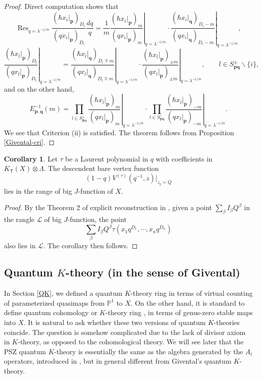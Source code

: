 \documentclass[10pt]{amsart}
\theoremstyle{definition}
\def\PP{{\mathbb{P}}}
\newcommand{\bp}{\mathbf{p}}
\newcommand{\bq}{\mathbf{q}}
\newcommand{\cL}{\mathcal{L}}
\newcommand{\Res}{\operatorname{Res}}
\newcommand{\bT}{\mathsf{T}}
\theoremstyle{definition}
\numberwithin{equation}{section}
\theoremstyle{Theorem}
\newtheorem{Corollary}[Definition]{Corollary}
\begin{document}
\begin{proof}
Direct computation shows that
$$
\Res_{q = \lambda^{-1/m}} \frac{ ( \hbar x_i |_\bp )_{D_i} }{ ( q x_i |_\bp )_{D_i} } \frac{dq}{q} = \frac{1}{m} \left. \frac{ ( \hbar x_i |_\bp )_{m} }{ ( q x_i |_\bp )_{m} } \right|_{q = \lambda^{-1/m}} \cdot \left. \frac{ ( \hbar x_i |_\bq )_{D_i - m} }{ ( q x_i |_\bq )_{D_i - m} } \right|_{q =  \lambda^{-1/m}} ,
$$
$$
\left. \frac{ ( \hbar x_l |_\bp )_{D_l} }{ ( q x_l |_\bp )_{D_l} } \right|_{q = \lambda^{-1/m}} = \left. \frac{ ( \hbar x_l |_\bq )_{D_l\mp m} }{ ( q x_l |_\bq )_{D_l \mp m} } \right|_{q = \lambda^{-1/m}} \cdot \left. \frac{ ( \hbar x_l |_\bp )_{\pm m} }{ ( q x_l |_\bp )_{\pm m} } \right|_{q = \lambda^{-1/m}}, \qquad l\in S_{\bp \bq}^\pm \backslash \{i\},
$$
and on the other hand,
$$
E_{\bp, \bq}^{-1} (m) =  \prod_{l\in S_{\bp \bq}^+} \left.  \frac{ ( \hbar x_l |_\bp )_{m} }{ ( q x_l |_\bp )_{m} } \right|_{q = \lambda^{-1/m}} \cdot \prod_{l\in S_{\bp \bq}^-} \left. \frac{ ( \hbar x_l |_\bp )_{-m} }{ ( q x_l |_\bp )_{-m} } \right|_{q = \lambda^{-1/m}}.
$$
We see that Criterion (ii) is satisfied. The theorem follows from Proposition \ref{Givental-cri}.
\end{proof}



\begin{Corollary} \label{V-tau}
Let $\tau$ be a Laurent polynomial in $q$ with coefficients in $K_\bT(X) \otimes \Lambda$. The descendent bare vertex function
$$
(1-q) V^{(\tau)} (q^{-1} , z) \big|_{z_\sharp = Q}
$$
lies in the range of big $J$-function of $X$.
\end{Corollary}

\begin{proof}
By the Theorem 2 of explicit reconstruction in \cite{Giv8}, given a point $\sum_\beta I_\beta Q^\beta$ in the rangle $\cL$ of big $J$-function, the point
$$
\sum_\beta I_\beta Q^\beta \tau (x_1 q^{D_1}, \cdots, x_n q^{D_n})
$$
also lies in $\cL$. The corollary then follows.
\end{proof}









\subsection{Quantum $K$-theory (in the sense of Givental)}

In Section \ref{QK}, we defined a quantum $K$-theory ring in terms of virtual counting of parameterized quasimaps from $\PP^1$ to $X$. On the other hand, it is standard to define quantum cohomology or $K$-theory ring \cite{Lee}, in terms of genus-zero stable maps into $X$. It is natural to ask whether these two versions of quantum $K$-theories coincide. The question is somehow complicated due to the lack of divisor axiom in $K$-theory, as opposed to the cohomological theory. We will see later that the PSZ quantum $K$-theory is essentially the same as the algebra generated by the $A_i$ operators, introduced in \cite{IMT}, but in general different from Givental's quantum $K$-theory.
\end{document}
